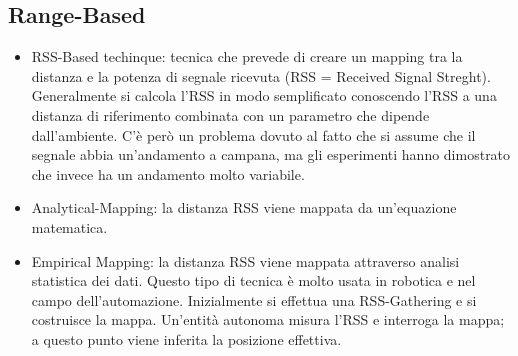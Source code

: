         \subsection{Range-Based}\label{subsubsec3.4.1}
        \begin{itemize}
                \item RSS-Based techinque: tecnica che prevede di creare un
mapping tra la distanza e la potenza di segnale ricevuta (RSS = Received Signal
Streght). Generalmente si calcola l'RSS in modo semplificato conoscendo l'RSS a
una distanza di riferimento combinata con un parametro che dipende
dall'ambiente. C'è però un problema dovuto al fatto che si assume che il segnale
abbia un'andamento a campana, ma gli esperimenti hanno dimostrato che invece ha
un andamento molto variabile.
                \item Analytical-Mapping: la distanza RSS viene mappata da
un'equazione matematica.
                \item Empirical Mapping: la distanza RSS viene mappata
attraverso analisi statistica dei dati. Questo tipo di tecnica è molto usata in
robotica e nel campo dell'automazione. Inizialmente si effettua una
RSS-Gathering e si costruisce la mappa. Un'entità autonoma misura l'RSS e
interroga la mappa; a questo punto viene inferita la posizione effettiva.
                \newpage
                \begin{centering}
\end{centering}
\end{itemize}
